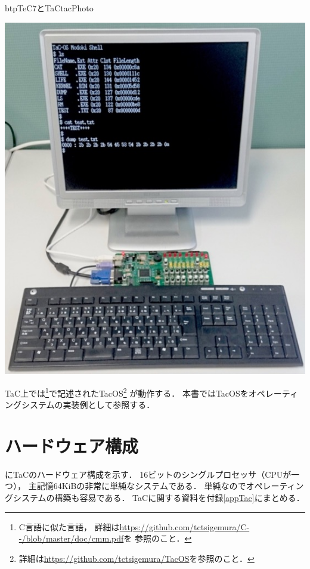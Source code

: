 \begin{myfig}{btp}{TeC7とTaC}{tacPhoto}
\begin{minipage}{0.38\columnwidth}
\begin{center}
      \includegraphics[scale=0.29]{Photo/TaC.jpg}\\
    \end{center}
  \end{minipage}
\end{myfig}

TaC上では{\cmml}\footnote{
  C言語に似た言語，
  詳細は\url{https://github.com/tctsigemura/C--/blob/master/doc/cmm.pdf}を
  参照のこと．}で記述されたTacOS\footnote{
  詳細は\url{https://github.com/tctsigemura/TacOS}を参照のこと．} が動作する．
本書ではTacOSをオペレーティングシステムの実装例として参照する．

\section{ハードウェア構成}
にTaCのハードウェア構成を示す．
16ビットのシングルプロセッサ（CPUが一つ），
主記憶64KiBの非常に単純なシステムである．
単純なのでオペレーティングシステムの構築も容易である．
TaCに関する資料を付録\ref{appTac}にまとめる．

